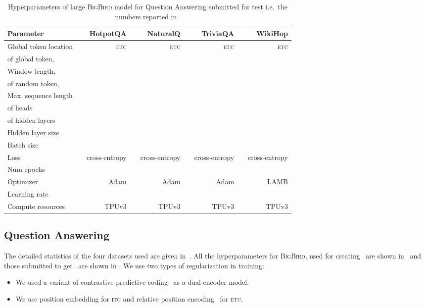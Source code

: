 \documentclass{article}
\newcommand{\bigb}{\textsc{BigBird}\xspace}
\begin{document}
\begin{table}[t]
\small
\centering
\begin{tabular}{@{}l c r c r c r c r@{}}
\toprule
Parameter & &  HotpotQA & & NaturalQ & & TriviaQA & & WikiHop \\
\midrule
Global token location & & \textsc{etc} & & \textsc{etc} & & \textsc{etc} & &\textsc{etc} \\
  of global token,  & &  & &  & &  & &   \\
 Window length,   & &  & &  & &  & &  \\
  of random token,  & &  & &  & &  & &  \\
 Max. sequence length & &  & &  & &  & & \\
  of heads & &  & &  & &  & & \\
 of hidden layers & &  & &  & &  & &  \\
 Hidden layer size & &  & &  & &  & &  \\
 Batch size & &  & &  & &  & &  \\
 Loss & & cross-entropy & & cross-entropy & & cross-entropy & & cross-entropy \\
 Num epochs & &  & &  & &  & &  \\
 Optimizer  & & Adam  & & Adam & & Adam & & LAMB\\
 Learning rate  & &  & &  & &  & &  \\
 Compute resources & &  TPUv3 & &  TPUv3 & &  TPUv3 & &  TPUv3\\
\bottomrule
\end{tabular}
\vspace{2mm}
\caption{Hyperparameters of large \bigb model for Question Answering submitted for test i.e.~the numbers reported in~}
\label{tab:app_qa}
\end{table}

\subsection{Question Answering}
\label{sec:app-expt-nlp:qa}

The detailed statistics of the four datasets used are given in~. 
All the hyperparameters for \bigb, used for creating~ are shown in~ and those submitted to get~ 
are shown in . 
We use two types of regularization in training:

\begin{itemize}[leftmargin=12mm, itemsep=0mm, partopsep=0pt,parsep=0pt]
    \item We used a variant of contrastive predictive coding~\citep{oord2018representation} as a dual encoder model.
    \item We use position embedding for \textsc{itc} and relative position encoding~\citep{shaw2018self} for \textsc{etc}.
\end{itemize}
\end{document}
